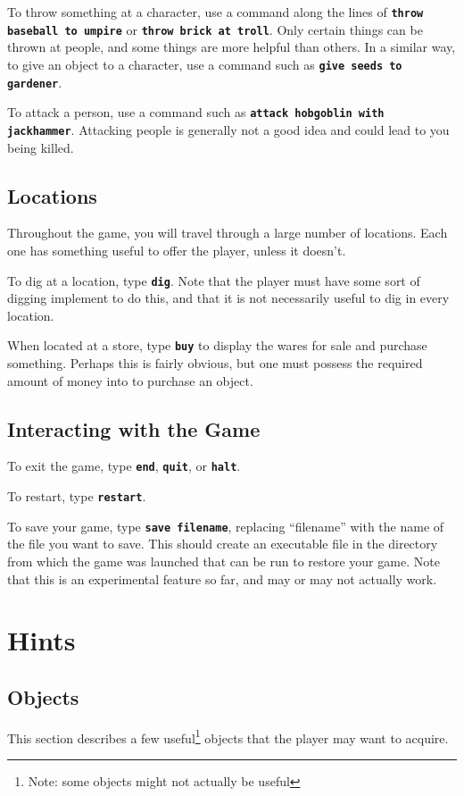 \documentclass{report}
\begin{document}
To throw something at a character, use a command along the lines of {\tt \bf throw baseball to umpire} or {\tt \bf throw brick at troll}. Only certain things can be thrown at people, and some things are more helpful than others.  
In a similar way, to give an object to a character, use a command such as {\tt\bf give seeds to gardener}.

To attack a person, use a command such as {\tt \bf attack hobgoblin with jackhammer}. Attacking people is generally not a good idea and could lead to you being killed.

\section{Locations}
Throughout the game, you will travel through a large number of locations. Each one has something useful to offer the player, unless it doesn't. 

To dig at a location, type {\tt \bf dig}. Note that the player must have some sort of digging implement to do this, and that it is not necessarily useful to dig in every location.

When located at a store, type {\tt \bf buy} to display the wares for sale and purchase something. Perhaps this is fairly obvious, but one must possess the required amount of money into to purchase an object.

\section{Interacting with the Game}
To exit the game, type {\tt \bf end}, {\tt \bf quit}, or {\tt \bf halt}.

To restart, type {\tt \bf restart}.

To save your game, type {\tt \bf save filename}, replacing ``filename'' with the name of the file you want to save. This should create an executable file in the directory from which the game was launched that can be run to restore your game. Note that this is an experimental feature so far, and may or may not actually work.

\chapter{Hints}
\section{Objects}
This section describes a few useful\footnote{Note: some objects might not actually be useful} objects that the player may want to acquire.
\end{document}
